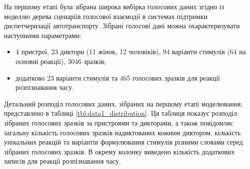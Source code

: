 На першому етапі була зібрана широка вибірка голосових даних згідно із моделлю дерева сценаріїв голосової взаємодії в системах підтримки диспетчеризації автотранспорту. Зібрані голосові дані можна охарактеризувати наступними параметрами:

\begin{itemize}
	\item 4 пристрої, 23 диктори (11 жінок, 12 чоловіків), 94 варіанти стимулів (64 на основні реакції), 3046 зразків;
	\item додатково 23 варіанти стимулів та 465 голосових зразків для реакції розпізнавання часу.
\end{itemize}

Детальний розподіл голосових даних, зібраних на першому етапі моделювання, представлено в таблиці \ref{tbl:data1_distribution}. Ця таблиця показує розподіл зібраних голосових зразків за пристроями та дикторами, а також повідомляє загальну кількість голосових зразків надиктованих кожним диктором, кількість унікальних реакцій та варіантів формулювання стимулів різними словами серед зібраних голосових зразків. В окрему колонку виведено кількість додаткових записів для реакції розпізнавання часу.

